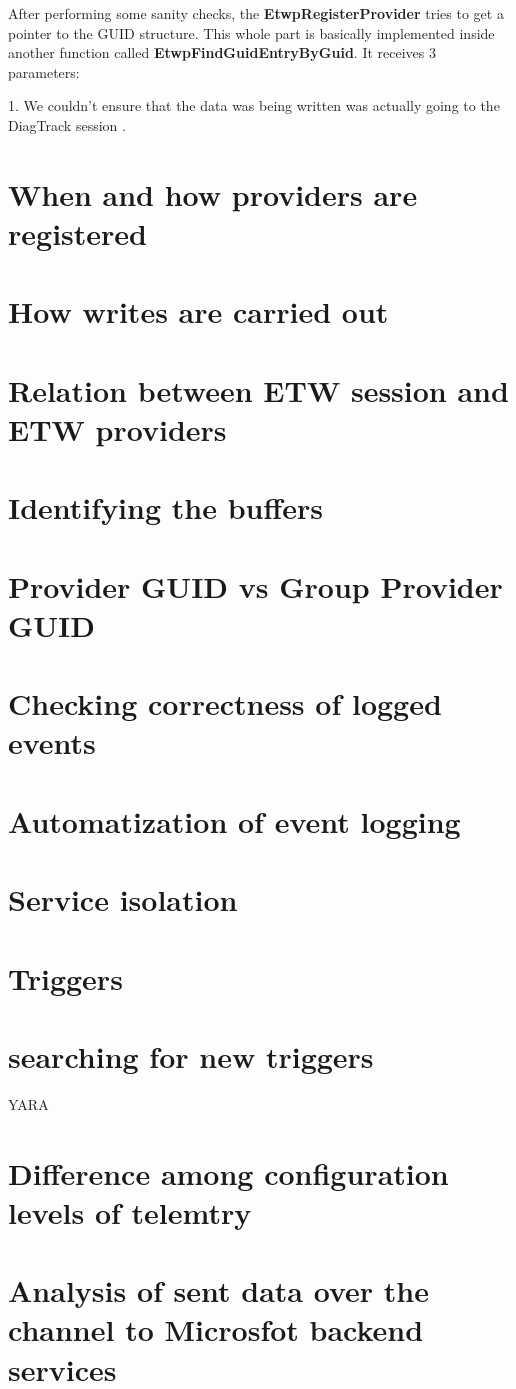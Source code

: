 After performing some sanity checks, the {\bfseries EtwpRegisterProvider} tries to get a pointer to the GUID structure. This whole part is basically implemented inside another function called {\bfseries EtwpFindGuidEntryByGuid}. It receives 3 parameters:


\newpage
{\huge 1. We couldn't ensure that the data was being written was actually going to the DiagTrack session .}

\section{When and how providers are registered}
\section{How writes are carried out}
\section{Relation between ETW session and ETW providers}
\section{Identifying the buffers}
\section{Provider GUID vs Group Provider GUID}
\section{Checking correctness of logged events}
\section{Automatization of event logging}
\section{Service isolation}
\section{Triggers}
\section{searching for new triggers} YARA
\section{Difference among configuration levels of telemtry}
\section{Analysis of sent data over the channel to Microsfot backend services}

